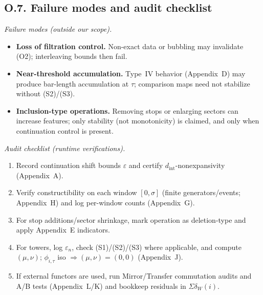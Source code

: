 \documentclass[11pt]{article}
\numberwithin{equation}{section}
\theoremstyle{definition}
\begin{document}
\subsection*{O.7. Failure modes and audit checklist}
\noindent\emph{Failure modes (outside our scope).}
\begin{itemize}\itemsep0.25em
  \item \textbf{Loss of filtration control.} Non-exact data or bubbling may invalidate (O2); interleaving bounds then fail.
  \item \textbf{Near-threshold accumulation.} Type~IV behavior (Appendix~D) may produce bar-length accumulation at \(\tau\); comparison maps need not stabilize without (S2)/(S3).
  \item \textbf{Inclusion-type operations.} Removing stops or enlarging sectors can increase features; only stability (not monotonicity) is claimed, and only when continuation control is present.
\end{itemize}

\noindent\emph{Audit checklist (runtime verifications).}
\begin{enumerate}\itemsep0.25em
  \item Record continuation shift bounds \(\varepsilon\) and certify \(d_{\mathrm{int}}\)-nonexpansivity (Appendix~A).
  \item Verify constructibility on each window \([0,\sigma]\) (finite generators/events; Appendix~H) and log per-window counts (Appendix~G).
  \item For stop additions/sector shrinkage, mark operation as deletion-type and apply Appendix~E indicators.
  \item For towers, log \(\varepsilon_n\), check (S1)/(S2)/(S3) where applicable, and compute \((\mu,\nu)\); \(\phi_{i,\tau}\) iso \(\Rightarrow (\mu,\nu)=(0,0)\) (Appendix~J).
  \item If external functors are used, run Mirror/Transfer commutation audits and A/B tests (Appendix~L/K) and bookkeep residuals in \(\Sigma\delta_W(i)\).
\end{enumerate}

\end{document}
